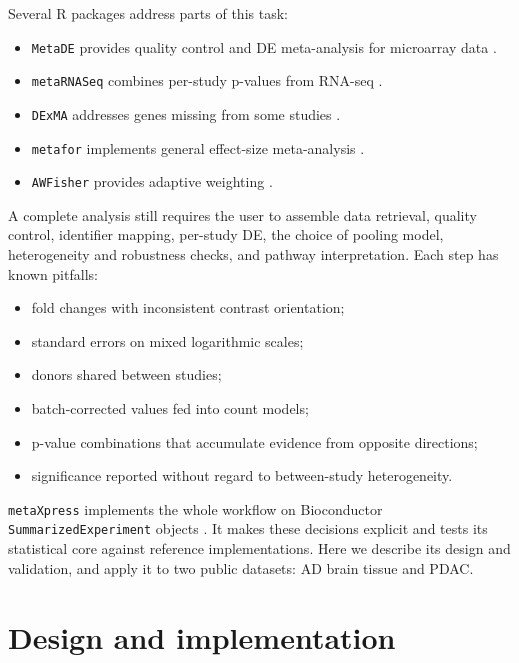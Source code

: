 \documentclass[11pt,a4paper]{article}
\begin{document}
Several R packages address parts of this task:
\begin{itemize}[noitemsep,topsep=2pt]
    \item \texttt{MetaDE} provides quality control and DE meta-analysis for microarray data \cite{wang2012metade}.
    \item \texttt{metaRNASeq} combines per-study p-values from RNA-seq \cite{rau2014metarnaseq}.
    \item \texttt{DExMA} addresses genes missing from some studies \cite{villatorogarcia2022dexma}.
    \item \texttt{metafor} implements general effect-size meta-analysis \cite{viechtbauer2010metafor}.
    \item \texttt{AWFisher} provides adaptive weighting \cite{huo2020awfisher}.
\end{itemize}
A complete analysis still requires the user to assemble data retrieval, quality control, identifier mapping, per-study DE, the choice of pooling model, heterogeneity and robustness checks, and pathway interpretation. Each step has known pitfalls:
\begin{itemize}[noitemsep,topsep=2pt]
    \item fold changes with inconsistent contrast orientation;
    \item standard errors on mixed logarithmic scales;
    \item donors shared between studies;
    \item batch-corrected values fed into count models;
    \item p-value combinations that accumulate evidence from opposite directions;
    \item significance reported without regard to between-study heterogeneity.
\end{itemize}

\texttt{metaXpress} implements the whole workflow on Bioconductor \texttt{SummarizedExperiment} objects \cite{huber2015orchestrating, morgan_se}. It makes these decisions explicit and tests its statistical core against reference implementations. Here we describe its design and validation, and apply it to two public datasets: AD brain tissue and PDAC.

\section{Design and implementation}
\end{document}
